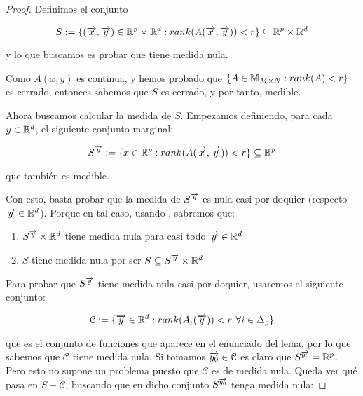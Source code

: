 \begin{proof}

    Definimos el conjunto

    \begin{equation}
        S := \{ (\overrightarrow{x}, \overrightarrow{y}) \in  \mathbb{R}^p \times \mathbb{R}^d: rank(A(\overrightarrow{x}, \overrightarrow{y})) < r \} \subseteq \mathbb{R}^p \times \mathbb{R}^d
    \end{equation}

    y lo que buscamos es probar que tiene medida nula.

    Como $A(x, y)$ es continua, y hemos probado que $\{ A \in \mathbb{M}_{M \times N}: rank(A) < r \}$ es cerrado, entonces sabemos que $S$ es cerrado, y por tanto, medible.

    Ahora buscamos calcular la medida de $S$. Empezamos definiendo, para cada $y \in \mathbb{R}^d$, el siguiente conjunto marginal:

    \begin{equation}
        S^{\overrightarrow{y}} := \{ x \in \mathbb{R}^p: rank(A(\overrightarrow{x}, \overrightarrow{y})) < r \} \subseteq \mathbb{R}^p
    \end{equation}

    que también es medible.

    Con esto, basta probar que la medida de $S^{\overrightarrow{y}}$ es nula casi por doquier (respecto $\overrightarrow{y} \in \mathbb{R}^d$). Porque en tal caso, usando , sabremos que:

    \begin{enumerate}
        \item $S^{\overrightarrow{y}} \times \mathbb{R}^d$ tiene medida nula para casi todo $\overrightarrow{y} \in \mathbb{R}^d$
        \item $S$ tiene medida nula por ser $S \subseteq S^{\overrightarrow{y}} \times \mathbb{R}^d$
    \end{enumerate}

    Para probar que $S^{\overrightarrow{y}}$ tiene medida nula casi por doquier, usaremos el siguiente conjunto:

    \begin{equation}
        \mathcal{C} := \{ \overrightarrow{y} \in \mathbb{R}^d: rank(A_i(\overrightarrow{y})) < r, \forall i \in \Delta_{p} \}
    \end{equation}

    que es el conjunto de funciones que aparece en el enunciado del lema, por lo que sabemos que $\mathcal{C}$ tiene medida nula. Si tomamos $\overrightarrow{y_0} \in \mathcal{C}$ es claro que $S^{\overrightarrow{y_0}} = \mathbb{R}^p$. Pero esto no supone un problema puesto que $\mathcal{C}$ es de medida nula. Queda ver qué pasa en $S - \mathcal{C}$, buscando que en dicho conjunto $S^{\overrightarrow{y_0}}$ tenga medida nula:


\end{proof}
